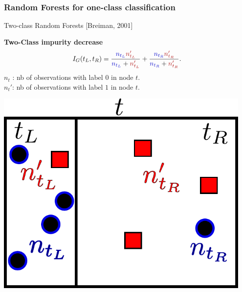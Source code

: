 \documentclass[9pt]{beamer}
\newcommand\red{\color{red} }
\newcommand\blue{\color{blue} }
\begin{document}

\begin{frame}
\frametitle{Random Forests for one-class classification}


\begin{block}{Two-class Random Forests [Breiman, 2001]}
\begin{minipage}{0.65\textwidth}
\textbf {Two-Class impurity decrease} 
\begin{align*}
I_G(t_L, t_R)= \frac{{\blue n_{t_L}} {\red n'_{t_L}}}{{\blue n_{t_L}} +  {\red n'_{t_L}}} + \frac{{\blue n_{t_R}} {\red n'_{t_R}}}{{\blue n_{t_R}} +  {\red n'_{t_R}}}.
\end{align*}
$n_t$ : nb of observations with label $0$ in node $t$.\\
$n_t'$: nb of observations with label $1$ in node $t$.

\end{minipage}
\begin{minipage}{0.3\textwidth}
	\centering
	\includegraphics[width=0.95\textwidth]{sourcefigs/tree.pdf}
\end{minipage}
\end{block}
~\\~\\


\end{frame}
\end{document}
